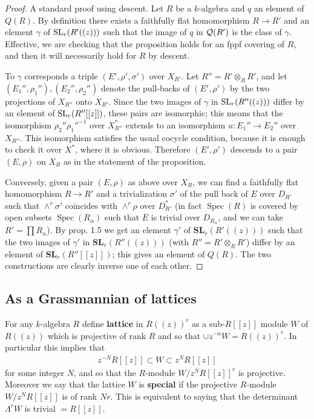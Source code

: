 \documentclass[12pt]{article}
\begin{document}
\begin{proof}
    A standard proof using descent. Let $R$ be a $k$-algebra and $q$ an element of $Q(R)$. By definition there exists a faithfully flat homomorphism $R \rightarrow R'$ and an element $\gamma$ of $\operatorname{SL}_r(R'((z)))$ such that the image of $q$ in ${\mathcal{Q}}(R')$ is the class of $\gamma$. Effective, we are checking that the proposition holds for an fppf covering of $R$, and then it will necessarily hold for $R$ by descent.

    To $\gamma$ corresponds a triple $(E', \rho', \sigma')$ over $X_{R'}$. Let $R'' = R' \otimes_{R} R'$, and let $(E_1'', \rho_1''), (E_2'', \rho_2'')$ denote the pull-backs of $(E', \rho')$ by the two projections of $X_{R''}$ onto $X_{R'}$. Since the two images of $\gamma$ in $\operatorname{SL}_r(R''((z)))$ differ by an element of $\operatorname{SL}_r(R''[[z]])$, these pairs are isomorphic; this means that the isomorphism $\rho_2''\rho_1''^{-1}$ over $X_{R''}^*$ extends to an isomorphism $u: E_1'' \rightarrow E_2''$ over $X_{R''}$. This isomorphism satisfies the usual cocycle condition, because it is enough to check it over $X^*$, where it is obvious. Therefore $(E', \rho')$ descends to a pair $(E, \rho)$ on $X_{R}$ as in the statement of the proposition.

    Conversely, given a pair $(E, \rho)$ as above over $X_{R}$, we can find a faithfully flat homomorphism $R \rightarrow R'$ and a trivialization $\sigma'$ of the pull back of $E$ over $D_{R'}$ such that $\wedge^r\sigma'$ coincides with $\wedge^r\rho$ over $D_{R'}^*$ (in fact $\operatorname{Spec}(R)$ is covered by open subsets $\operatorname{Spec}(R_\alpha)$ such that $E$ is trivial over $D_{R_\alpha}$, and we can take $R' = \prod R_\alpha$). By prop. 1.5 we get an element $\gamma'$ of $\mathbf{SL}_r(R'((z)))$ such that the two images of $\gamma'$ in $\mathbf{SL}_r(R''((z)))$ (with $R'' = R' \otimes_{R} R'$) differ by an element of $\mathbf{SL}_r(R''[[z]])$; this gives an element of $Q(R)$. The two constructions are clearly inverse one of each other.
\end{proof}

\subsection{As a Grassmannian of lattices}
For any $k$-algebra $R$ define \textbf{lattice} in $R((z))^r$ as a sub-$R[[z]]$ module $W$ of $R((z))$ which is projective of rank $R$ and so that $\cup z^{-n}W = R((z))^r$. In particular this implies that \begin{align*}
    z^{-N}R[[z]] \subset W \subset z^N R[[z]]
\end{align*} for some integer $N$, and so that the $R$-module $W/z^NR[[z]]^r$ is projective. Moreover we say that the lattice $W$ is \textbf{special} if the projective $R$-module $W/z^NR[[z]]$ is of rank $Nr.$ This is equivalent to saying that the determinant $\Lambda^rW$ is trivial $= R[[z]]$.
\end{document}
